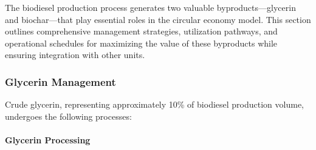 The biodiesel production process generates two valuable byproducts—glycerin and biochar—that play essential roles in the circular economy model. This section outlines comprehensive management strategies, utilization pathways, and operational schedules for maximizing the value of these byproducts while ensuring integration with other units.

\subsubsection{Glycerin Management}
\label{sec:glycerin_utilization}

Crude glycerin, representing approximately 10\% of biodiesel production volume, undergoes the following processes:

\paragraph{Glycerin Processing}
